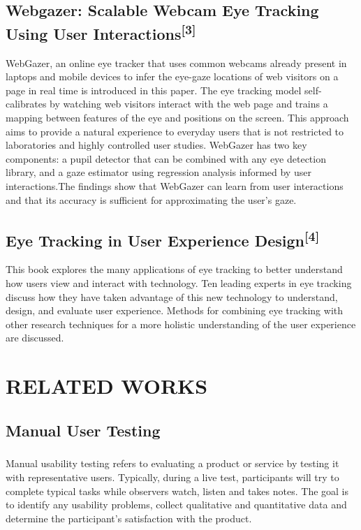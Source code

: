 \documentclass[hidelinks,12pt,a4paper,final]{extreport}
\begin{document}
\section{Webgazer: Scalable Webcam Eye Tracking Using User Interactions\textsuperscript{[3]}}
WebGazer, an online eye tracker that uses common webcams already present in laptops and mobile devices to infer the eye-gaze locations of web visitors on a page in real time is introduced in this paper. The eye tracking
model self-calibrates by watching web visitors interact with the web page and trains a mapping between features of the eye and positions on the screen. This
approach aims to provide a natural experience to everyday users that is not restricted to laboratories and highly controlled user studies. WebGazer has
two key components: a pupil detector that can be combined with any eye detection library, and a gaze estimator using regression analysis informed by user
interactions.The findings show that WebGazer can learn from user interactions and that its accuracy is sufficient for approximating the user’s gaze.

\section{Eye Tracking in User Experience Design\textsuperscript{[4]}}
This book explores the many applications of eye tracking to better understand how users view and interact with technology. Ten leading experts in eye tracking discuss how they have taken advantage of this new technology to understand, design, and evaluate user experience. Methods for combining eye tracking with other research techniques for a more holistic understanding of the user experience are discussed.
\newpage
\chapter{RELATED WORKS}
\section{Manual User Testing}
\paragraph{}
Manual usability testing refers to evaluating a product or service by testing it with representative users. Typically, during a live test, participants will try to complete typical tasks while observers watch, listen and takes notes.  The goal is to identify any usability problems, collect qualitative and quantitative data and determine the participant's satisfaction with the product.
\end{document}
